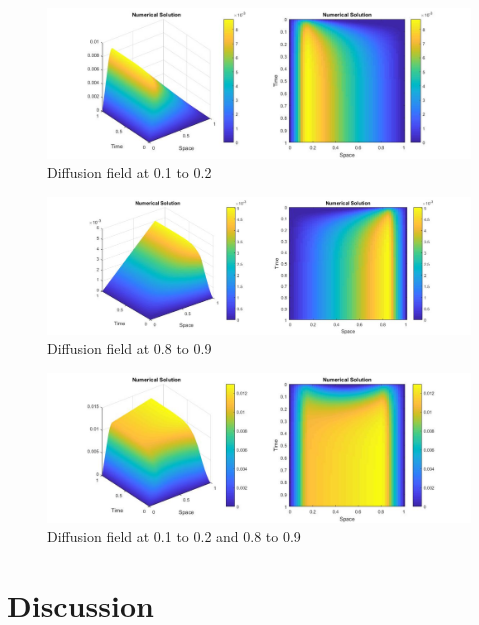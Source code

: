 \documentclass{article}
\begin{document}
\begin{figure}
	\begin{center}
		\includegraphics[width=\textwidth,height=\textheight,keepaspectratio]{MATLAB/D5.jpg}
	\end{center}
	\caption{Diffusion field at 0.1 to 0.2}
\end{figure}
\begin{figure}
	\begin{center}
		\includegraphics[width=\textwidth,height=\textheight,keepaspectratio]{MATLAB/D6.jpg}
	\end{center}
	\caption{Diffusion field at 0.8 to 0.9}
\end{figure}
\begin{figure}
	\begin{center}
		\includegraphics[width=\textwidth,height=\textheight,keepaspectratio]{MATLAB/D7.jpg}
	\end{center}
	\caption{Diffusion field at 0.1 to 0.2 and 0.8 to 0.9}
\end{figure}
\newpage
\section{Discussion}
\end{document}
